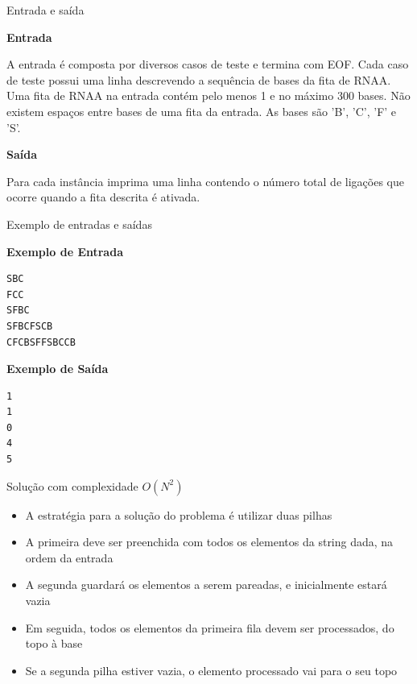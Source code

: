 \begin{frame}[fragile]{Entrada e saída}

\textbf{Entrada}

A entrada é composta por diversos casos de teste e termina com EOF. Cada caso de teste possui uma linha descrevendo a sequência de bases da fita de RNAA. Uma fita de RNAA na entrada contém pelo menos 1 e no máximo 300 bases. Não existem espaços entre bases de uma fita da entrada. As bases são 'B', 'C', 'F' e 'S'.

\vspace{0.2in}

\textbf{Saída}

Para cada instância imprima uma linha contendo o número total de ligações que ocorre quando a fita descrita é ativada.

\end{frame}


\begin{frame}[fragile]{Exemplo de entradas e saídas}

\begin{minipage}[t]{0.5\textwidth}
\textbf{Exemplo de Entrada}
\begin{verbatim}
SBC
FCC
SFBC
SFBCFSCB
CFCBSFFSBCCB
\end{verbatim}
\end{minipage}
\begin{minipage}[t]{0.45\textwidth}
\textbf{Exemplo de Saída}
\begin{verbatim}
1
1
0
4
5
\end{verbatim}
\end{minipage}
\end{frame}

\begin{frame}[fragile]{Solução com complexidade $O(N^2)$}

    \begin{itemize}
        \item A estratégia para a solução do problema é utilizar duas pilhas

        \item A primeira deve ser preenchida com todos os elementos da string dada, na ordem da
            entrada

        \item A segunda guardará os elementos a serem pareadas, e inicialmente estará vazia

        \item Em seguida, todos os elementos da primeira fila devem ser processados, do topo à
            base

        \item Se a segunda pilha estiver vazia, o elemento processado vai para o seu topo

   \end{itemize}

\end{frame}

